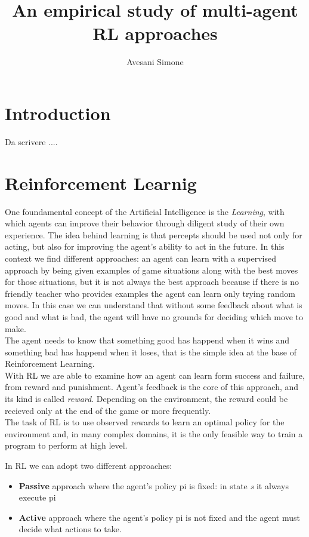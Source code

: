 \documentclass[]{report}
\title{An empirical study of multi-agent RL approaches}
\author{Avesani Simone}
\date{}
\begin{document}
\maketitle
\newpage
\tableofcontents
\newpage



\chapter{Introduction}
Da scrivere ....
\chapter{Reinforcement Learnig}\label{reinforcement-learnig}

One foundamental concept of the Artificial Intelligence is the
\emph{Learning}, with which agents can improve their behavior through
diligent study of their own experience. The idea behind learning is that
percepts should be used not only for acting, but also for improving the
agent's ability to act in the future. In this context we find different
approaches: an agent can learn with a supervised approach by being given
examples of game situations along with the best moves for those
situations, but it is not always the best approach because if there is
no friendly teacher who provides examples the agent can learn only
trying random moves. In this case we can understand that without some
feedback about what is good and what is bad, the agent will have no
grounds for deciding which move to make. \\The agent needs to know that
something good has happend when it wins and something bad has happend
when it loses, that is the simple idea at the base of Reinforcement
Learning.\\ With RL we are able to examine how an agent can learn form
success and failure, from reward and punishment. Agent's feedback is the
core of this approach, and its kind is called \emph{reward}. Depending
on the environment, the reward could be recieved only at the end of the
game or more frequently.\\ The task of RL is to use observed rewards to
learn an optimal policy for the environment and, in many complex domains,
it is the only feasible way to train a program to perform at high level.

In RL we can adopt two different approaches:

\begin{itemize}

\item
  \textbf{Passive} approach where the agent's policy pi is fixed: in
  state \emph{s} it always execute pi
\item
  \textbf{Active} approach where the agent's policy pi is not fixed and
  the agent must decide what actions to take.
\end{itemize}
\end{document}
